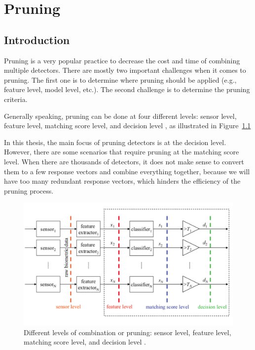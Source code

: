 \chapter{Pruning} \label{chapter3}


 \section{Introduction}
\label{sec:chap3-introduction}

Pruning is a very popular practice to decrease the cost and time of combining multiple detectors. There are mostly two important challenges when it comes to pruning. The first one is to determine where pruning should be applied (e.g., feature level, model level, etc.). The second challenge is to determine the pruning criteria.

Generally speaking, pruning can be done at four different levels: sensor level, feature level, matching score level, and decision level \cite{Tao2009}, as illustrated in Figure~\ref{fig::level_of_pruning}

 In this thesis, the main focus of pruning detectors is at the decision level. However, there are some scenarios that require pruning at the matching score level. When there are thousands of detectors, it does not make sense to convert them to a few response vectors and combine everything together, because  we will have too many redundant response vectors, which hinders the efficiency of the pruning process.


\begin{figure}[]
\centering
\includegraphics[width=1\linewidth]{figs/level-of-pruning}
\caption{Different levels of combination or pruning: sensor level, feature level, matching score level, and decision level \cite{Tao2009}.}
\label{fig::level_of_pruning}
\end{figure}

